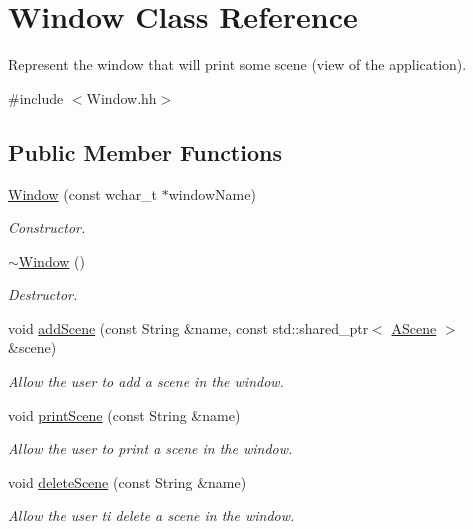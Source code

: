 \hypertarget{classWindow}{}\section{Window Class Reference}
\label{classWindow}


Represent the window that will print some scene (view of the application).  




{\ttfamily \#include $<$Window.\+hh$>$}

\subsection*{Public Member Functions}
\begin{DoxyCompactItemize}
\item 
\hyperlink{classWindow_a25fd6af55e81b781b132166f77daf77e}{Window} (const wchar\+\_\+t $\ast$window\+Name)
\begin{DoxyCompactList}\small\item\em Constructor. \end{DoxyCompactList}\item 
\hyperlink{classWindow_a245d821e6016fa1f6970ccbbedd635f6}{$\sim$\+Window} ()
\begin{DoxyCompactList}\small\item\em Destructor. \end{DoxyCompactList}\item 
void \hyperlink{classWindow_ac9150ac221e5569e677586d5a1123518}{add\+Scene} (const String \&name, const std\+::shared\+\_\+ptr$<$ \hyperlink{classAScene}{A\+Scene} $>$ \&scene)
\begin{DoxyCompactList}\small\item\em Allow the user to add a scene in the window. \end{DoxyCompactList}\item 
void \hyperlink{classWindow_a9e73c1dc8b22cdf16e6446af6f7ade48}{print\+Scene} (const String \&name)
\begin{DoxyCompactList}\small\item\em Allow the user to print a scene in the window. \end{DoxyCompactList}\item 
void \hyperlink{classWindow_ad3a1ead02eca314e2df94e3e932fb5ae}{delete\+Scene} (const String \&name)
\begin{DoxyCompactList}\small\item\em Allow the user ti delete a scene in the window. \end{DoxyCompactList}\item 

\end{DoxyCompactItemize}
